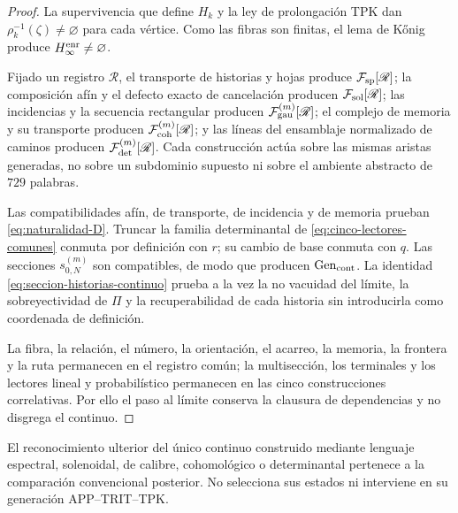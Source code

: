 \begin{proof}
La supervivencia que define \(H_k\) y la ley de prolongación TPK dan
\(\rho_k^{-1}(\zeta)\neq\varnothing\) para cada vértice. Como las fibras son
finitas, el lema de Kőnig produce \(H_\infty^{\rm enr}\neq\varnothing\).

Fijado un registro \(\mathscr R\), el transporte de historias y hojas produce
\(\mathcal F_{\rm sp}[\mathscr R]\); la composición afín y el defecto exacto
de cancelación producen \(\mathcal F_{\rm sol}[\mathscr R]\); las incidencias
y la secuencia rectangular producen \(\mathcal F_{\rm gau}^{(m)}[\mathscr R]\);
el complejo de memoria y su transporte producen
\(\mathcal F_{\rm coh}^{(m)}[\mathscr R]\); y las líneas del ensamblaje
normalizado de caminos producen \(\mathcal F_{\rm det}^{(m)}[\mathscr R]\).
Cada construcción actúa sobre las mismas aristas generadas, no sobre un
subdominio supuesto ni sobre el ambiente abstracto de \(729\) palabras.

Las compatibilidades afín, de transporte, de incidencia y de memoria prueban
\eqref{eq:naturalidad-D}. Truncar la familia determinantal de
\eqref{eq:cinco-lectores-comunes} conmuta por
definición con \(r\); su cambio de base conmuta con \(q\). Las secciones
\(s_{0,N}^{(m)}\) son compatibles, de modo que producen
\(\operatorname{Gen}_{\rm cont}\). La identidad
\eqref{eq:seccion-historias-continuo} prueba a la vez la no
vacuidad del límite, la sobreyectividad de \(\Pi\) y la recuperabilidad de cada
historia sin introducirla como coordenada de definición.

La fibra, la relación, el número, la orientación, el acarreo, la memoria, la
frontera y la ruta permanecen en el registro común; la multisección, los
terminales y los lectores lineal y probabilístico permanecen en las cinco
construcciones correlativas. Por ello el paso al límite conserva la clausura de
dependencias y no disgrega el continuo.
\end{proof}

El reconocimiento ulterior del único continuo construido mediante lenguaje
espectral, solenoidal, de calibre, cohomológico o determinantal pertenece a la
comparación convencional posterior. No selecciona sus estados ni interviene en
su generación APP--TRIT--TPK.
